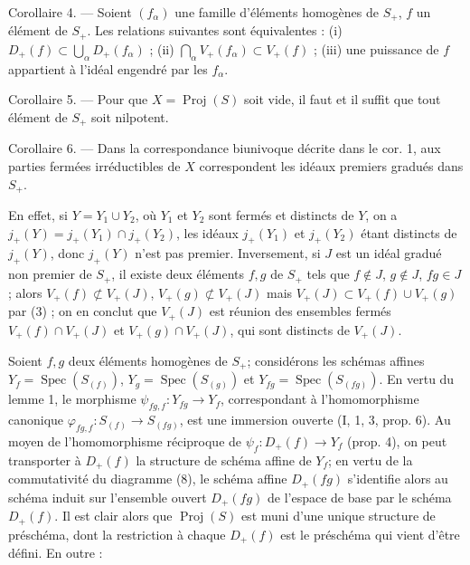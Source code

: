 \newpage



Corollaire 4. — Soient $(f_\alpha)$ une famille d'éléments homogènes de $S_+$, $f$ un élément de $S_+$. Les relations suivantes sont équivalentes :
(i) $D_+(f) \subset \bigcup_\alpha D_+(f_\alpha)$ ; (ii) $\bigcap_\alpha V_+(f_\alpha) \subset V_+(f)$ ; (iii) une puissance de $f$ appartient à l'idéal engendré par les $f_\alpha$.

Corollaire 5. — Pour que $X = \operatorname{Proj}(S)$ soit vide, il faut et il suffit que tout élément de $S_+$ soit nilpotent.

Corollaire 6. — Dans la correspondance biunivoque décrite dans le cor. 1, aux parties fermées irréductibles de $X$ correspondent les idéaux premiers gradués dans $S_+$.

En effet, si $Y = Y_1 \cup Y_2$, où $Y_1$ et $Y_2$ sont fermés et distincts de $Y$, on a $j_+(Y) = j_+(Y_1) \cap j_+(Y_2)$, les idéaux $j_+(Y_1)$ et $j_+(Y_2)$ étant distincts de $j_+(Y)$, donc $j_+(Y)$ n'est pas premier. Inversement, si $J$ est un idéal gradué non premier de $S_+$, il existe deux éléments $f, g$ de $S_+$ tels que $f \notin J$, $g \notin J$, $fg \in J$ ; alors $V_+(f) \not\subset V_+(J)$, $V_+(g) \not\subset V_+(J)$ mais $V_+(J) \subset V_+(f) \cup V_+(g)$ par (3) ; on en conclut que $V_+(J)$ est réunion des ensembles fermés $V_+(f) \cap V_+(J)$ et $V_+(g) \cap V_+(J)$, qui sont distincts de $V_+(J)$.

Soient $f, g$ deux éléments homogènes de $S_+$; considérons les schémas affines $Y_f = \operatorname{Spec}(S_{(f)})$, $Y_g = \operatorname{Spec}(S_{(g)})$ et $Y_{fg} = \operatorname{Spec}(S_{(fg)})$. En vertu du lemme 1, le morphisme $\psi_{fg,f} : Y_{fg} \to Y_f$, correspondant à l'homomorphisme canonique $\varphi_{fg,f} : S_{(f)} \to S_{(fg)}$, est une immersion ouverte (I, 1, 3, prop. 6). Au moyen de l'homomorphisme réciproque de $\psi_{f} : D_+(f) \to Y_f$ (prop. 4), on peut transporter à $D_+(f)$ la structure de schéma affine de $Y_f$; en vertu de la commutativité du diagramme (8), le schéma affine $D_+(fg)$ s'identifie alors au schéma induit sur l'ensemble ouvert $D_+(fg)$ de l'espace de base par le schéma $D_+(f)$. Il est clair alors que $\operatorname{Proj}(S)$ est muni d'une unique structure de préschéma, dont la restriction à chaque $D_+(f)$ est le préschéma qui vient d'être défini. En outre :

\newpage


